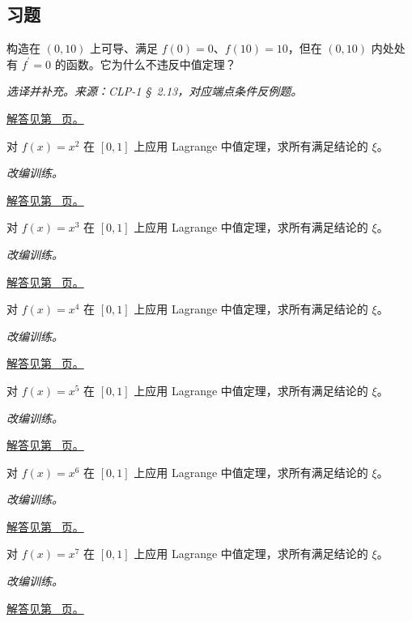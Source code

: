 \documentclass[UTF8,12pt,a4paper,fontset=fandol]{ctexart}
\begin{document}
\subsection{习题}
\begin{example}[端点连续性不能省略]\label{ex:c10q1}
构造在 $(0,10)$ 上可导、满足 $f(0)=0$、$f(10)=10$，但在 $(0,10)$ 内处处有 $f^{\prime}=0$ 的函数。它为什么不违反中值定理？
\par\textit{选译并补充。来源：CLP-1 \S~2.13，对应端点条件反例题。}\par\hyperref[ans:c10q1]{解答见第~\pageref{ans:c10q1} 页。}
\end{example}
\begin{example}[中值点的精确计算]\label{ex:c10q2}
对 $f(x)=x^{2}$ 在 $[0,1]$ 上应用 Lagrange 中值定理，求所有满足结论的 $\xi$。
\par\textit{改编训练。}\par\hyperref[ans:c10q2]{解答见第~\pageref{ans:c10q2} 页。}
\end{example}
\begin{example}[中值点的精确计算]\label{ex:c10q3}
对 $f(x)=x^{3}$ 在 $[0,1]$ 上应用 Lagrange 中值定理，求所有满足结论的 $\xi$。
\par\textit{改编训练。}\par\hyperref[ans:c10q3]{解答见第~\pageref{ans:c10q3} 页。}
\end{example}
\begin{example}[中值点的精确计算]\label{ex:c10q4}
对 $f(x)=x^{4}$ 在 $[0,1]$ 上应用 Lagrange 中值定理，求所有满足结论的 $\xi$。
\par\textit{改编训练。}\par\hyperref[ans:c10q4]{解答见第~\pageref{ans:c10q4} 页。}
\end{example}
\begin{example}[中值点的精确计算]\label{ex:c10q5}
对 $f(x)=x^{5}$ 在 $[0,1]$ 上应用 Lagrange 中值定理，求所有满足结论的 $\xi$。
\par\textit{改编训练。}\par\hyperref[ans:c10q5]{解答见第~\pageref{ans:c10q5} 页。}
\end{example}
\begin{example}[中值点的精确计算]\label{ex:c10q6}
对 $f(x)=x^{6}$ 在 $[0,1]$ 上应用 Lagrange 中值定理，求所有满足结论的 $\xi$。
\par\textit{改编训练。}\par\hyperref[ans:c10q6]{解答见第~\pageref{ans:c10q6} 页。}
\end{example}
\begin{example}[中值点的精确计算]\label{ex:c10q7}
对 $f(x)=x^{7}$ 在 $[0,1]$ 上应用 Lagrange 中值定理，求所有满足结论的 $\xi$。
\par\textit{改编训练。}\par\hyperref[ans:c10q7]{解答见第~\pageref{ans:c10q7} 页。}
\end{example}
\end{document}
